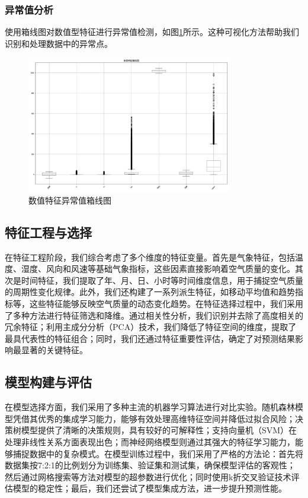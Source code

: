 \subsubsection{异常值分析}
使用箱线图对数值型特征进行异常值检测，如图\ref{fig:outliers}所示。这种可视化方法帮助我们识别和处理数据中的异常点。

\begin{figure}[H]
    \centering
    \includegraphics[width=0.8\textwidth]{images/outliers_boxplot.png}
    \caption{数值特征异常值箱线图}
    \label{fig:outliers}
\end{figure}

\subsection{特征工程与选择}
在特征工程阶段，我们综合考虑了多个维度的特征变量。首先是气象特征，包括温度、湿度、风向和风速等基础气象指标，这些因素直接影响着空气质量的变化。其次是时间特征，我们提取了年、月、日、小时等时间维度信息，用于捕捉空气质量的周期性变化规律。此外，我们还构建了一系列派生特征，如移动平均值和趋势指标等，这些特征能够反映空气质量的动态变化趋势。在特征选择过程中，我们采用了多种方法进行特征筛选和降维。通过相关性分析，我们识别并去除了高度相关的冗余特征；利用主成分分析（PCA）技术，我们降低了特征空间的维度，提取了最具代表性的特征组合；同时，我们还通过特征重要性评估，确定了对预测结果影响最显著的关键特征。

\subsection{模型构建与评估}
在模型选择方面，我们采用了多种主流的机器学习算法进行对比实验。随机森林模型凭借其优秀的集成学习能力，能够有效处理高维特征空间并降低过拟合风险；决策树模型提供了清晰的决策规则，具有较好的可解释性；支持向量机（SVM）在处理非线性关系方面表现出色；而神经网络模型则通过其强大的特征学习能力，能够捕捉数据中的复杂模式。在模型训练过程中，我们采用了严格的方法论：首先将数据集按7:2:1的比例划分为训练集、验证集和测试集，确保模型评估的客观性；然后通过网格搜索等方法对模型的超参数进行优化；同时使用k折交叉验证技术评估模型的稳定性；最后，我们还尝试了模型集成方法，进一步提升预测性能。

